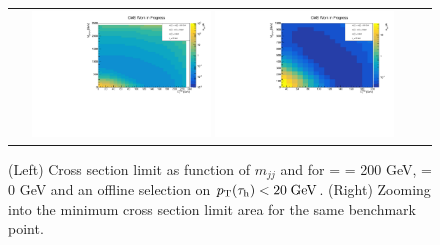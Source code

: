 \begin{figure}[tbh!]
	\centering
	\begin{tabular}{cc}
		\includegraphics[width=0.45\textwidth]{analysis/pics/JetInvMass_vs_MET_xsec_chi200_lsp000_taupt20.pdf}
		\includegraphics[width=0.45\textwidth]{analysis/pics/JetInvMass_vs_MET_xsec_chi200_lsp000_taupt20_zoom.pdf}
	\end{tabular}
	\caption{(Left) Cross section limit as function of $m_{jj}$ and \met for \charginopm = \neutralinotwo = 200 GeV, \neutralinoone = 0 GeV and an offline selection on $p_{\text{T}}(\tau_{\text{h}}) <  20\;\text{Ge}\kern-0.06667em\text{V}$. (Right) Zooming into the minimum cross section limit area for the same benchmark point.}
	\label{fig::JetInvMass_vs_MET_xsec_chi200_lsp000_taupt20}
\end{figure}

